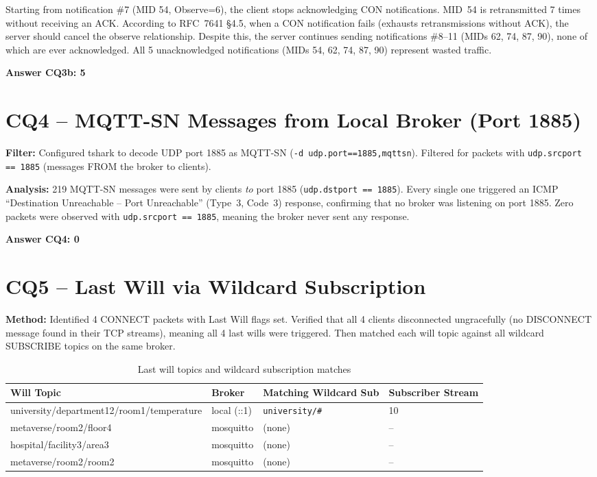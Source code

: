\documentclass[12pt,a4paper]{article}
\begin{document}
Starting from notification \#7 (MID 54, Observe=6), the client stops acknowledging
CON notifications. MID~54 is retransmitted 7 times without receiving an ACK. According
to RFC~7641 \S4.5, when a CON notification fails (exhausts retransmissions without ACK),
the server should cancel the observe relationship. Despite this, the server continues
sending notifications \#8--11 (MIDs 62, 74, 87, 90), none of which are ever
acknowledged. All 5 unacknowledged notifications (MIDs 54, 62, 74, 87, 90) represent
wasted traffic.

\textbf{Answer CQ3b: 5}

\section{CQ4 -- MQTT-SN Messages from Local Broker (Port 1885)}

\textbf{Filter:} Configured tshark to decode UDP port 1885 as MQTT-SN
(\texttt{-d udp.port==1885,mqttsn}). Filtered for packets with
\texttt{udp.srcport == 1885} (messages FROM the broker to clients).

\textbf{Analysis:} 219 MQTT-SN messages were sent by clients \emph{to} port 1885
(\texttt{udp.dstport == 1885}). Every single one triggered an ICMP
``Destination Unreachable -- Port Unreachable'' (Type~3, Code~3) response, confirming
that no broker was listening on port 1885. Zero packets were observed with
\texttt{udp.srcport == 1885}, meaning the broker never sent any response.

\textbf{Answer CQ4: 0}

\section{CQ5 -- Last Will via Wildcard Subscription}

\textbf{Method:} Identified 4 CONNECT packets with Last Will flags set. Verified that all 4 clients
disconnected ungracefully (no DISCONNECT message found in their TCP streams), meaning all 4 last wills
were triggered. Then matched each will topic against all wildcard SUBSCRIBE topics on the same broker.

\begin{table}[H]
\centering
\begin{tabular}{@{}llll@{}}
\toprule
Will Topic & Broker & Matching Wildcard Sub & Subscriber Stream \\
\midrule
university/department12/room1/temperature & local (::1) & \texttt{university/\#} & 10 \\
metaverse/room2/floor4 & mosquitto & (none) & -- \\
hospital/facility3/area3 & mosquitto & (none) & -- \\
metaverse/room2/room2 & mosquitto & (none) & -- \\
\bottomrule
\end{tabular}
\caption{Last will topics and wildcard subscription matches}
\end{table}
\end{document}
